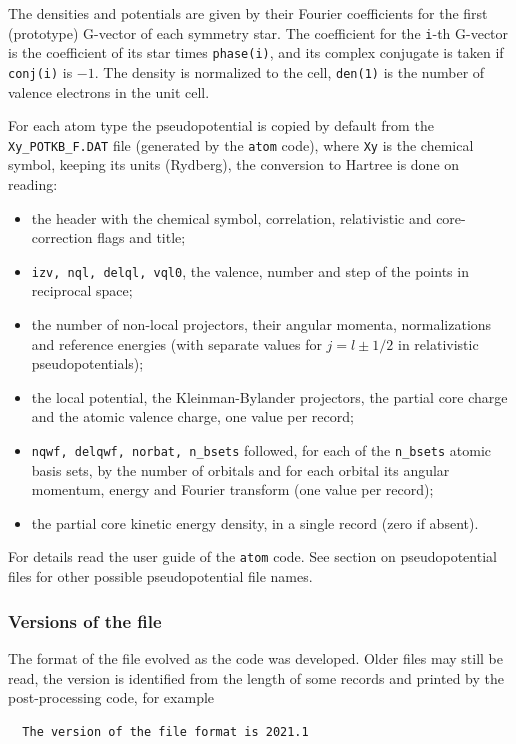 \documentclass[11pt]{article}
\begin{document}
The densities and potentials are given by their Fourier coefficients for the
first (prototype) G-vector of each symmetry star.  The coefficient for the
\texttt{i}-th G-vector is the coefficient of its star times \texttt{phase(i)},
and its complex conjugate is taken if \texttt{conj(i)} is $-1$.
The density is normalized to the cell, \texttt{den(1)} is the number of valence electrons
in the unit cell.

For each atom type the pseudopotential is copied by default from the
\texttt{Xy\_POTKB\_F.DAT} file (generated by the \texttt{atom} code), where \texttt{Xy} is the chemical symbol, keeping its units (Rydberg),
the conversion to Hartree is done on reading:
\begin{itemize}
\item the header with the chemical symbol, correlation, relativistic and core-correction flags and title;
\item \texttt{izv, nql, delql, vql0}, the valence, number and step of the points in reciprocal space;
\item the number of non-local projectors, their angular momenta, normalizations and reference energies
   (with separate values for $j = l \pm 1/2$ in relativistic pseudopotentials);
\item the local potential, the Kleinman-Bylander projectors, the partial core charge
   and the atomic valence charge, one value per record;
\item \texttt{nqwf, delqwf, norbat, n\_bsets} followed, for each of the \texttt{n\_bsets}
   atomic basis sets, by the number of orbitals and for each orbital its angular momentum,
   energy and Fourier transform (one value per record);
\item the partial core kinetic energy density, in a single record (zero if absent).
\end{itemize}
For details read the user guide of the \texttt{atom} code.  See section on pseudopotential files
for other possible pseudopotential file names.

\subsubsection*{Versions of the file}

The format of the file evolved as the code was developed.  Older files may still
be read, the version is identified from the length of some records
and printed by the post-processing code, for example
\begin{verbatim}
  The version of the file format is 2021.1
\end{verbatim}
\end{document}
